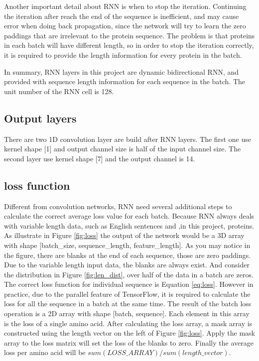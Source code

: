 Another important detail about RNN is when to stop the iteration. Continuing the iteration after reach the end of the sequence is inefficient, and may cause error when doing back propagation, since the network will try to learn the zero paddings that are irrelevant to the protein sequence. The problem is that proteins in each batch will have different length, so in order to stop the iteration correctly, it is required to provide the length information for every protein in the batch.\par

In summary, RNN layers in this project are dynamic bidirectional RNN, and provided with sequence length information for each sequence in the batch. The unit number of the RNN cell is 128.

\subsection{Output layers}
There are two 1D convolution layer are build after RNN layers. The first one use kernel shape [1] and output channel size is half of the input channel size. The second layer use kernel shape [7] and the output channel is 14.\par
\subsection{loss function}
Different from convolution networks, RNN need several additional steps to calculate the correct average loss value for each batch. Because RNN always deals with variable length data, such as English sentences and ,in this project, proteins. As illustrate in Figure \ref{fig:loss} the output of the network would be a 3D array with shape [batch\_size, sequence\_length, feature\_length]. As you may notice in the figure, there are blanks at the end of each sequence, those are zero paddings. Due to the variable length input data, the blanks are always exist. And consider the distribution in Figure \ref{fig:len_dist}, over half of the data in a batch are zeros. The correct loss function for individual sequence is Equation \ref{eq:loss}. However in practice, due to the parallel feature of TensorFlow, it is required to calculate the loss for all the sequence in a batch at the same time. The result of the batch loss operation is a 2D array with shape [batch, sequence]. Each element in this array is the loss of a single amino acid. After calculating the loss array, a mask array is constructed using the length vector on the left of Figure \ref{fig:loss}. Apply the mask array to the loss matrix will set the loss of the blanks to zero. Finally the average loss per amino acid will be $sum(LOSS\_ARRAY)/sum(length\_vector)$.\par


